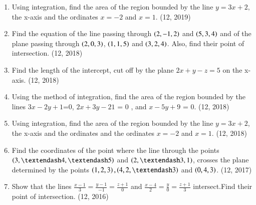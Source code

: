 \begin{enumerate}[label=\thesubsection.\arabic*, ref=\thesubsection.\theenumi]
\item Using integration, find the area of the region bounded by the line $y = 3x + 2,$ the x-axis and the ordinates $x = - 2$ and $x = 1$. \hfill (12, 2019)
\item Find the equation of the line passing through $\left(2,-1, 2\right)$ and $\left(5, 3, 4\right)$ and of the plane passing through $\left(2, 0, 3\right)$, $\left(1, 1, 5\right)$ and $\left(3, 2, 4\right)$. Also, find their point of intersection. \hfill (12, 2018)
\item Find the length of the intercept, cut off by the plane $2x+y-z=5$ on the x-axis. \hfill (12, 2018)
\item Using the method of integration, find the area of the region bounded by the lines $3x-2y+1$=$0$, $2x+3y-21$ = $0$ , and  $x-5y+9$ = $0$. \hfill (12, 2018)
\item Using integration, find the area of the region bounded by the line $y = 3x + 2$, the x-axis and the ordinates and the ordinates $x=-2$ and $x=1$. \hfill (12, 2018)
\item Find the coordinates of the point where the line through the points $\brak{3, – 4, – 5}$ and $\brak{2, – 3, 1}$, crosses the plane determined by the points $\brak{1, 2, 3}, \brak{4, 2, – 3}$ and $\left(0, 4, 3\right)$. \hfill (12, 2017)
\item Show that the lines $\frac{x-1}{3} = \frac{y-1}{-1} = \frac{z+1}{0} $ and $\frac{x-4}{2} = \frac{y}{0} = \frac{z+1}{3} $ intersect.Find their point of intersection. \hfill (12, 2016)
\end{enumerate}
